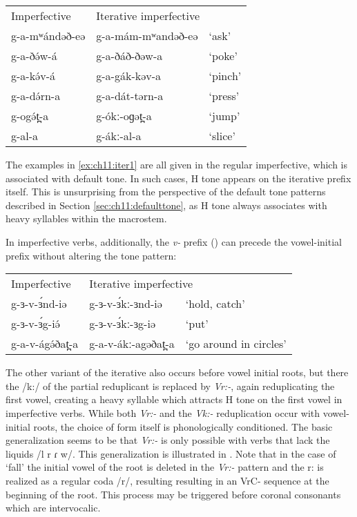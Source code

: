 \ea  \label{ex:ch11:iter1}
\begin{tabular}[t]{lll}
Imperfective	&	\multicolumn{2}{l}{Iterative imperfective}\\
g-a-mʷándəð-eə 	&	g-a-mám-mʷandəð-eə	&	‘ask’\\
g-a-ðə́w-á		&	g-a-ðáð-ðəw-a		&	‘poke’\\
g-a-kə́v-á		&	g-a-gák-kəv-a		&	‘pinch’\\
g-a-də́rn-a		&	g-a-dát-tərn-a		&	‘press’\\
g-ogə́t̪-a			&	g-ókː-oɡət̪-a			&	‘jump’\\
g-al-a			&	g-ákː-al-a			&	‘slice’\\ 	
\end{tabular}
\z 
The examples in \ref{ex:ch11:iter1} are all given in the regular imperfective, which is associated with default tone. In such cases, H tone appears on the iterative prefix itself. This is unsurprising from the perspective of the default tone patterns described in Section \ref{sec:ch11:defaulttone}, as H tone always associates with heavy syllables within the macrostem.

In imperfective verbs, additionally, the \textit{v-} prefix () can precede the vowel-initial prefix without altering the tone pattern:

\ea \begin{tabular}[t]{lll}
Imperfective	&	\multicolumn{2}{l}{Iterative imperfective}\\
g-ɜ-v-ɜ́nd-iə		&	g-ɜ-v-ɜ́kː-ɜnd-iə	&	‘hold, catch’\\ 
g-ɜ-v-ɜ́g-iə́ 		&	g-ɜ-v-ɜ́kː-ɜg-iə		&	‘put’\\
g-a-v-ágə́ðat̪-a	&	g-a-v-ákː-agəðat̪-a	&	‘go around
				in circles’\\ 	
\end{tabular}
\z 

The other variant of the iterative also occurs before vowel initial roots, but there the /k:/ of the partial reduplicant is replaced by \textit{Vr:-}, again reduplicating the first vowel, creating a heavy syllable which attracts H tone on the first vowel in imperfective verbs. While both  \textit{Vr:-} and the \textit{Vk:-} reduplication occur with vowel-initial roots, the choice of form itself is phonologically conditioned. The basic generalization seems to be that \textit{Vr:-} is only possible with verbs that lack the liquids /l r ɾ w/. This generalization is illustrated in . Note that in the case of `fall' the initial vowel of the root is deleted in the \textit{Vr:-} pattern and the r: is realized as a regular coda /r/, resulting resulting in an VrC- sequence at the beginning of the root. This process may be triggered before coronal consonants which are intervocalic.

